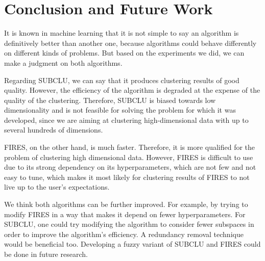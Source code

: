 \section{Conclusion and Future Work}\raggedbottom
It is known in machine learning that it is not simple to say an algorithm is definitively better than another one, because algorithms could behave differently on different kinds of problems. But based on the experiments we did, we can make a judgment on both algorithms. 

Regarding SUBCLU, we can say that it produces clustering results of good quality. However, the efficiency of the algorithm is degraded at the expense of the quality of the clustering. Therefore, SUBCLU is biased towards low dimensionality and is not feasible for solving the problem for which it was developed, since we are aiming at clustering high-dimensional data with up to several hundreds of dimensions. 

FIRES, on the other hand, is much faster. Therefore, it is more qualified for the problem of clustering high dimensional data. However, FIRES is difficult to use due to its strong dependency on its hyperparameters, which are not few and not easy to tune, which makes it most likely for clustering results of FIRES to not live up to the user's expectations.

We think both algorithms can be further improved. For example, by trying to modify FIRES in a way that makes it depend on fewer hyperparameters. For SUBCLU, one could try modifying the algorithm to consider fewer subspaces in order to improve the algorithm's efficiency. A redundancy removal technique would be beneficial too. Developing a fuzzy variant of SUBCLU and FIRES could be done in future research.